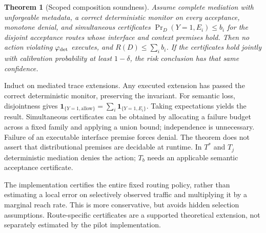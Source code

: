 ﻿\documentclass[lettersize,journal]{IEEEtran}
\newtheorem{theorem}{Theorem}
\begin{document}
\begin{theorem}[Scoped composition soundness]
\label{thm:composition}
Assume complete mediation with unforgeable metadata, a correct deterministic
monitor on every acceptance, monotone denial, and simultaneous certificates
$\Pr_D(Y=1,E_i)\leq b_i$ for the disjoint acceptance routes whose interface and
context premises hold. Then no action violating $\varphi_{\rm det}$ executes,
and $R(D)\leq\sum_i b_i$. If the certificates hold jointly with calibration
probability at least $1-\delta$, the risk conclusion has that same confidence.
\end{theorem}
\begin{IEEEproof}
Induct on mediated trace extensions. Any executed extension has passed the
correct deterministic monitor, preserving the invariant. For semantic loss,
disjointness gives
$\mathbf{1}_{\{Y=1,\mathrm{allow}\}}=\sum_i\mathbf{1}_{\{Y=1,E_i\}}$.
Taking expectations yields the result. Simultaneous certificates can be
obtained by allocating a failure budget across a fixed family and applying a
union bound; independence is unnecessary. Failure of an executable interface
premise forces denial. The theorem does not assert that distributional
premises are decidable at runtime. In $T^*$ and $T_j$ deterministic mediation
denies the action; $T_b$ needs an applicable semantic acceptance certificate.
\end{IEEEproof}

The implementation certifies the entire fixed routing policy, rather than
estimating a local error on selectively observed traffic and multiplying it
by a marginal reach rate. This is more conservative, but avoids hidden
selection assumptions. Route-specific certificates are a supported theoretical
extension, not separately estimated by the pilot implementation.
\end{document}
